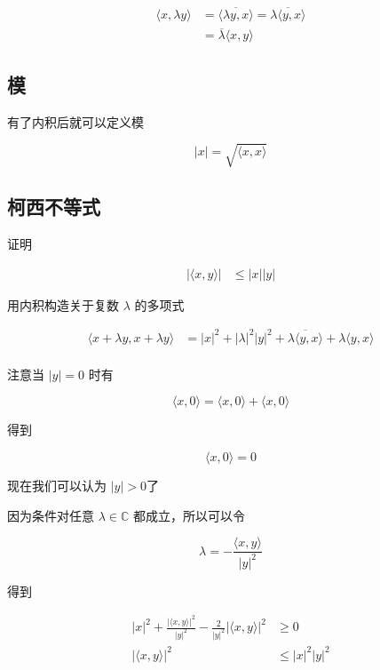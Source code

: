 \documentclass[12pt,a4paper]{ctexart}
\begin{document}
\begin{align*}
\langle x , \lambda y \rangle &= \overline{ \langle \lambda y, x \rangle} = \overline{\lambda \langle y, x\rangle} \\
&= \overline{\lambda} \langle x, y \rangle
\end{align*}

\subsection{模}

有了内积后就可以定义模

\[
\lvert x \rvert  = \sqrt{ \langle x,x\rangle}
\]

\subsection{柯西不等式}

证明

\begin{align*}
    \lvert \langle x,y \rangle \rvert &\le \lvert x \rvert \lvert y \rvert 
\end{align*}

用内积构造关于复数 $\lambda $ 的多项式

\begin{align*}
    \langle x + \lambda y, x + \lambda y \rangle &= \lvert x \rvert^2 + \lvert \lambda \rvert^2 \lvert y\rvert^2 + \overline{\lambda \langle y,x \rangle} + \lambda \langle y,x \rangle \\
\end{align*}


注意当 $\lvert y \rvert = 0$ 时有

\[
\langle x, 0\rangle = \langle x, 0\rangle +\langle x, 0\rangle
\]

得到

\[
\langle x, 0\rangle = 0
\]

现在我们可以认为 $\lvert y \rvert > 0$了

因为条件对任意 $\lambda \in \mathbb{C}$ 都成立，所以可以令

\[
\lambda = -\frac{\langle x,y \rangle}{\lvert y\rvert^2}
\]

得到

\begin{align*}
\lvert x \rvert^2 + \frac{\lvert \langle x,y\rangle \rvert^2}{\lvert y \rvert ^2} - \frac{2}{\lvert y \rvert^2} \lvert \langle x, y\rangle \rvert^2 & \ge 0 \\
\lvert \langle x,y\rangle \rvert^2 & \le \lvert x \rvert^2 \lvert y \rvert ^2 
\end{align*}
\end{document}
